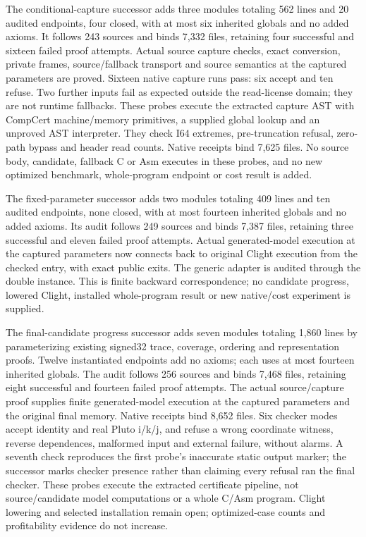 The conditional-capture successor adds three modules totaling 562 lines and
20 audited endpoints, four closed, with at most six inherited globals and no
added axioms. It follows 243 sources and binds 7,332 files, retaining four
successful and sixteen failed proof attempts. Actual source capture checks,
exact conversion, private frames, source/fallback transport and source semantics
at the captured parameters are proved. Sixteen native capture runs pass:
six accept and ten refuse. Two further inputs fail as expected outside the
read-license domain; they are not runtime fallbacks. These probes execute the
extracted capture AST with CompCert machine/memory primitives, a supplied global
lookup and an unproved AST interpreter. They check I64 extremes, pre-truncation
refusal, zero-path bypass and header read counts. Native receipts bind 7,625
files. No source body, candidate, fallback C or Asm executes in these probes,
and no new optimized benchmark, whole-program endpoint or cost result is added.

The fixed-parameter successor adds two modules totaling 409 lines and ten
audited endpoints, none closed, with at most fourteen inherited globals and
no added axioms. Its audit follows 249 sources and binds 7,387 files, retaining
three successful and eleven failed proof attempts. Actual generated-model
execution at the captured parameters now connects back to original Clight
execution from the checked entry, with exact public exits. The generic adapter
is audited through the double instance. This is finite backward correspondence;
no candidate progress, lowered Clight, installed whole-program result or new
native/cost experiment is supplied.

The final-candidate progress successor adds seven modules totaling 1,860 lines
by parameterizing existing signed32 trace, coverage, ordering and representation
proofs. Twelve instantiated endpoints add no axioms; each uses at most fourteen
inherited globals. The audit follows 256 sources and binds 7,468 files, retaining
eight successful and fourteen failed proof attempts. The actual source/capture
proof supplies finite generated-model execution at the captured parameters and
the original final memory. Native receipts bind 8,652 files. Six checker modes
accept identity and real Pluto i/k/j, and refuse a wrong coordinate witness,
reverse dependences, malformed input and external failure, without alarms.
A seventh check reproduces the first probe's inaccurate static output marker;
the successor marks checker presence rather than claiming every refusal ran
the final checker. These probes execute the extracted certificate pipeline,
not source/candidate model computations or a whole C/Asm program. Clight
lowering and selected installation remain open; optimized-case counts and
profitability evidence do not increase.

